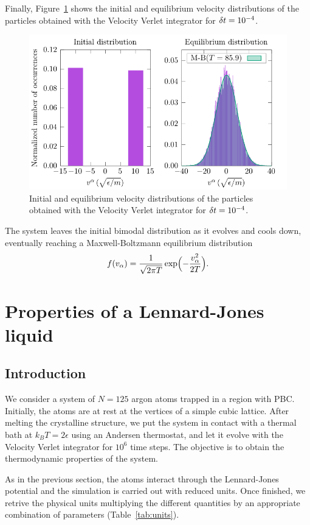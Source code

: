 \documentclass{article}
\begin{document}
  Finally, Figure~\ref{fig:hist} shows the initial and equilibrium velocity distributions of the particles obtained with the Velocity Verlet integrator for \(\delta t=10^{-4}\).
  \begin{figure}[htb]
    \centering
    \includegraphics[width=\linewidth]{../figures/vel_verlet_histogram.pdf}
    \caption{Initial and equilibrium velocity distributions of the particles obtained with the Velocity Verlet integrator for \(\delta t=10^{-4}\).}\label{fig:hist}
  \end{figure}
  The system leaves the initial bimodal distribution as it evolves and cools down, eventually reaching a Maxwell-Boltzmann equilibrium distribution
  \[
    f(v_{\alpha})=\frac{1}{\sqrt{2\pi T}}\exp\Bigl(-\frac{v_{\alpha}^{2}}{2T}\Bigr).
  \]

  \section{Properties of a Lennard-Jones liquid}

  \subsection{Introduction}

  We consider a system of \(N=125\) argon atoms trapped in a region with PBC. Initially, the atoms are at rest at the vertices of a simple cubic lattice. After melting the crystalline structure, we put the system in contact with a thermal bath at \(k_{B}T=2\epsilon\) using an Andersen thermostat, and let it evolve with the Velocity Verlet integrator for \(10^{6}\) time steps. The objective is to obtain the thermodynamic properties of the system.

  As in the previous section, the atoms interact through the Lennard-Jones potential and the simulation is carried out with reduced units. Once finished, we retrive the physical units multiplying the different quantities by an appropriate combination of parameters (Table~\ref{tab:units}).
\end{document}
